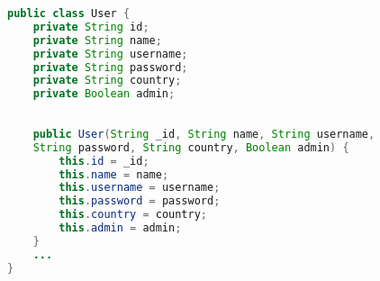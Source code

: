 \begin{lstlisting}[language=Java,  basicstyle=\footnotesize]
public class User {
	private String id;
	private String name;
	private String username;
	private String password;
	private String country;
	private Boolean admin;
	
	
	public User(String _id, String name, String username,
	String password, String country, Boolean admin) {
		this.id = _id;
		this.name = name;
		this.username = username;
		this.password = password;
		this.country = country;
		this.admin = admin;
	}
	...
}
\end{lstlisting}